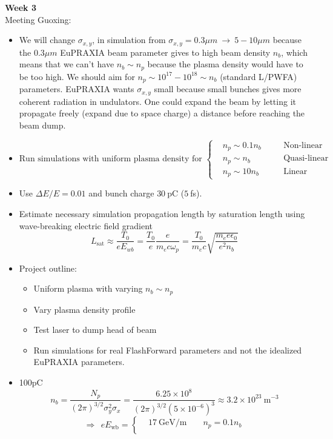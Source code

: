 \documentclass[%
onecolumn, notitlepage,
 amsmath,amssymb,
 aps,
]{article}
\begin{document}
\noindent \textbf{Week 3}\\
Meeting Guoxing:
\begin{itemize}
\item We will change $\sigma_{x,y}$, in simulation from $\sigma_{x,y}=0.3 \mu m ~\to~5-10 \mu m$ because the $0.3\mu m$ EuPRAXIA beam parameter gives to high beam density $n_b$, which means that we can't have $n_b\sim n_p$ because the plasma density would have to be too high. We should aim for $n_p\sim 10^{17}-10^{18}\sim n_b$ (standard L/PWFA) parameters. 
EuPRAXIA wants $\sigma_{x,y}$ small because small bunches gives more coherent radiation in undulators. One could expand the beam by letting it propagate freely (expand due to space charge) a distance before reaching the beam dump. 
\item $\text{Run simulations with uniform plasma density for }\left\{\begin{aligned}
&n_p\sim 0.1 n_b \quad &&\text{Non-linear}\\
&n_p\sim  n_b\quad &&\text{Quasi-linear}\\
&n_p\sim 10 n_b\quad &&\text{Linear}
\end{aligned}\right.$ \\
\item Use $\Delta E/E=0.01$ and bunch charge $30~$pC ($5~$fs).\\
\item Estimate necessary simulation propagation length by saturation length using wave-breaking electric field gradient 
$$L_{\text{sat}}\approx \frac{T_0}{eE_{wb}}=\frac{T_0}{e}\frac{e}{m_e c\omega_p}=\frac{T_0}{m_e c}\sqrt{\frac{m_e e\epsilon_0}{e^2n_b}} $$ 
\item Project outline:
\begin{itemize}
\item Uniform plasma with varying $n_b\sim n_p$
\item Vary plasma density profile
\item Test laser to dump head of beam
\item Run simulations for real FlashForward parameters and not the idealized EuPRAXIA parameters.
\end{itemize}
\item  100pC $$n_b=\frac{N_p}{(2\pi)^{3/2} \sigma_y^2\sigma_x}=\frac{6.25\times 10^{8}}{(2\pi)^{3/2} (5\times 10^{-6})^3}\approx 3.2\times 10^{23}~ \text{m}^{-3} $$
$$\Rightarrow ~~eE_{\text{wb}}=\left\{\begin{aligned}
&17 ~\text{GeV/m }&& n_p=0.1 n_b \\

\end{aligned}$$
\end{itemize}
\end{document}
